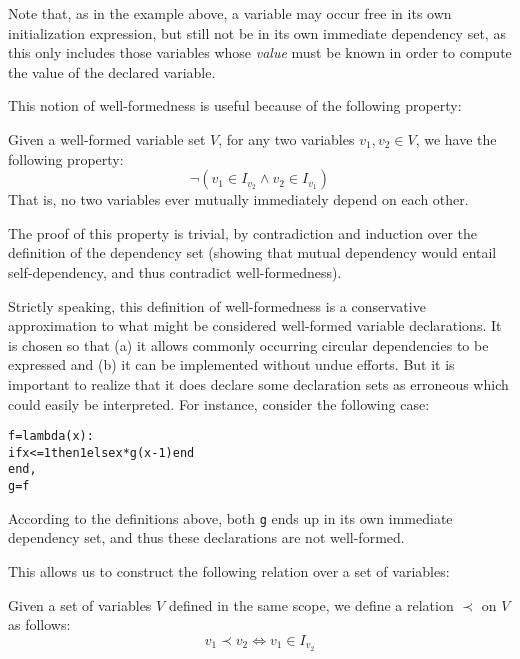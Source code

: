 Note that, as in the example above, a variable may occur free in its
own initialization expression, but still not be in its own immediate
dependency set, as this only includes those variables whose {\em
  value} must be known in order to compute the value of the declared variable.

This notion of well-formedness is useful because of the following property:

\begin{corollary}
  Given a well-formed variable set $V$, for any two variables $v_1,
  v_2 \in V$, we have the following property:
  $$\neg (v_1 \in I_{v_2} \wedge v_2 \in I_{v_1})$$
  That is, no two
  variables ever mutually immediately depend on each other.
\end{corollary}

The proof of this property is trivial, by contradiction and induction
over the definition of the dependency set (showing that mutual
dependency would entail self-dependency, and thus contradict
well-formedness).

\begin{rationale}
  Strictly speaking, this definition of well-formedness is a
  conservative approximation to what might be considered well-formed
  variable declarations. It is chosen so that (a) it allows commonly
  occurring circular dependencies to be expressed and (b) it can be
  implemented without undue efforts. But it is important to realize
  that it does declare some declaration sets as erroneous which could
  easily be interpreted. For instance, consider the following case:
  \begin{alltt}    f = lambda (x) :
      if x <= 1 then 1 else x * g(x - 1) end
    end,
    g = f
  \end{alltt}
  According to the definitions above, both {\tt g} ends up in its own
  immediate dependency set, and thus these declarations are not
  well-formed.
\end{rationale}


This allows us to construct the following relation over a set of
variables:

\begin{defn}
Given a set of variables $V$ defined in the same scope, we define a
relation $\prec$ on $V$ as follows:
$$v_1 \prec v_2 \Longleftrightarrow v_1 \in I_{v_2}$$
\end{defn}

